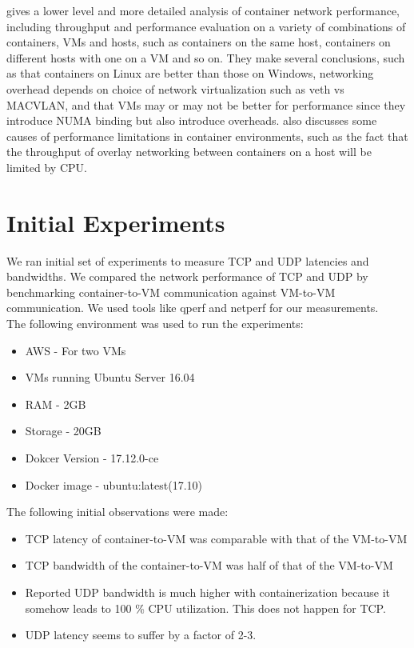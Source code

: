 \documentclass[letterpaper, 10 pt, conference]{ieeeconf}  %
\begin{document}
\cite{zhao2017performance} gives a lower level and more detailed analysis of container network performance, including throughput and performance evaluation on a variety of combinations of containers, VMs and hosts, such as containers on the same host, containers on different hosts with one on a VM and so on. They make several conclusions, such as that containers on Linux are better than those on Windows, networking overhead depends on choice of network virtualization such as veth vs MACVLAN, and that VMs may or may not be better for performance since they introduce NUMA binding but also  introduce overheads. \cite{yu2016freeflow} also discusses some causes of performance limitations in container environments, such as the fact that the throughput of overlay networking between containers on a host will be limited by CPU.
\section{Initial Experiments}
We ran initial set of experiments to measure TCP and UDP latencies and bandwidths. We compared the network performance of TCP and UDP by benchmarking container-to-VM communication against VM-to-VM communication. We used tools like qperf \cite{qperf} and netperf \cite{netperf} for our measurements.
\\ The following environment was used to run the experiments:
\begin{itemize}
\item AWS - For two VMs
\item VMs running Ubuntu Server 16.04
\item RAM - 2GB
\item Storage - 20GB
\item Dokcer Version - 17.12.0-ce
\item Docker image - ubuntu:latest(17.10)
\end{itemize}
The following initial observations were made:
\begin{itemize}
\item TCP latency of container-to-VM was comparable with that of the VM-to-VM
\item TCP bandwidth of the container-to-VM was half of that of the VM-to-VM
\item Reported UDP bandwidth is much higher with containerization because it somehow leads to 100 \% CPU utilization. This does not happen for TCP.
\item UDP latency seems to suffer by a factor of 2-3.
\end{itemize}
\end{document}
